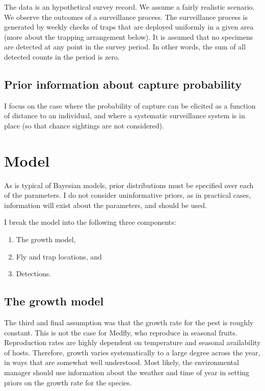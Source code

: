 \documentclass[
]{book}
\providecommand{\tightlist}{%
  \setlength{\itemsep}{0pt}\setlength{\parskip}{0pt}}
\begin{document}
The data is an hypothetical survey record. We assume a fairly realistic scenario. We observe the outcomes of a surveillance process. The surveillance process is generated by weekly checks of traps that are deployed uniformly in a given area (more about the trapping arrangement below). It is assumed that no specimens are detected at any point in the survey period. In other words, the sum of all detected counts in the period is zero.

\hypertarget{prior-information-about-capture-probability}{%
\subsection{Prior information about capture probability}\label{prior-information-about-capture-probability}}

I focus on the case where the probability of capture can be elicited as a function of distance to an individual, and where a systematic surveillance system is in place (so that chance sightings are not considered).

\hypertarget{model}{%
\section{Model}\label{model}}

As is typical of Bayesian models, prior distributions must be specified over each of the parameters. I do not consider uninformative priors, as in practical cases, information will exist about the parameters, and should be used.

I break the model into the following three components:

\begin{enumerate}
\def\labelenumi{\arabic{enumi}.}
\tightlist
\item
  The growth model,
\item
  Fly and trap locations, and
\item
  Detections.
\end{enumerate}

\hypertarget{the-growth-model}{%
\subsection{The growth model}\label{the-growth-model}}

The third and final assumption was that the growth rate for the pest is roughly constant. This is not the case for Medfly, who reproduce in seasonal fruits. Reproduction rates are highly dependent on temperature and seasonal availability of hosts. Therefore, growth varies systematically to a large degree across the year, in ways that are somewhat well understood. Most likely, the environmental manager should use information about the weather and time of year in setting priors on the growth rate for the species.
\end{document}
